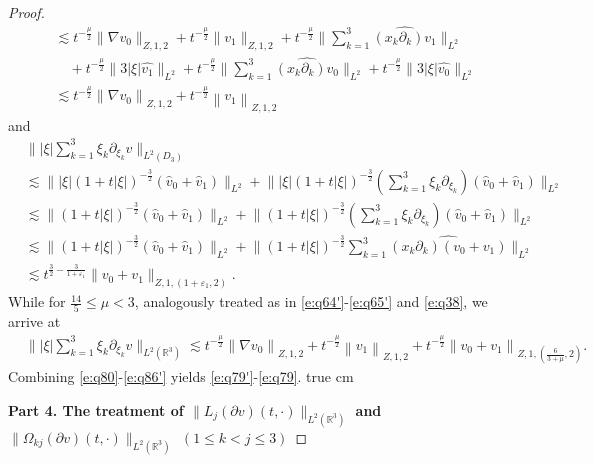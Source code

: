 \documentclass[11pt,twoside]{article}
\newcommand{\R}{\mathbb R}
\newcommand{\p}{\partial}
\newcommand{\f}{\frac}
\newcommand{\ds}{\displaystyle}
\theoremstyle{plain}
\theoremstyle{definition}
\theoremstyle{remark}
\numberwithin{equation}{section}
\begin{document}
\begin{proof}
\begin{equation}
\begin{aligned}
& \lesssim t^{-\frac{\mu}{2}}\big\|\nabla v_{0}\big\|_{Z, 1, 2}+ t^{-\frac{\mu}{2}}\big\|v_{1}\big\|_{Z, 1, 2}+ t^{-\f{\mu}{2}}
\big\|\ds\sum_{k=1}^3\widehat{(x_k\p_k)v_1}\big\|_{L^{2}}\\
&\quad+ t^{-\f{\mu}{2}} \big\|3|\xi|\widehat{v_1}\big\|_{L^{2}}+t^{-\f{\mu}{2}} \big\|\ds\sum_{k=1}^3\widehat{(x_k\p_k)v_0}\big\|_{L^{2}}+ t^{-\f{\mu}{2}} \big\|3|\xi|\widehat{v_0}\big\|_{L^{2}}\\
&\lesssim  t^{-\f{\mu}{2}}\left\|\nabla v_0\right\|_{Z, 1, 2}+t^{-\f{\mu}{2}}\left\|v_1\right\|_{Z, 1, 2}
\end{aligned}
\end{equation}
and
\begin{equation}\label{e:q86}
\begin{aligned}
&\||\xi|\ds\sum_{k=1}^3\xi_k\p_{\xi_k}\hat{v}\|_{L^2(D_3)}\\
&\lesssim \big\||\xi|(1+t|\xi|)^{-\f32}(\hat{v}_{0}+\hat{v}_{1})\big\|_{L^{2}}+ \big\||\xi|(1+t|\xi|)^{-\f32}(\ds\sum_{k=1}^3\xi_k\p_{\xi_k})(\hat{v}_{0}+\hat{v}_{1})\big\|_{L^{2}}\\
&\lesssim \big\|(1+t|\xi|)^{-\f32}(\hat{v}_{0}+\hat{v}_{1})\big\|_{L^{2}}+ \big\|(1+t|\xi|)^{-\f32}(\ds\sum_{k=1}^3\xi_k\p_{\xi_k})(\hat{v}_{0}+\hat{v}_{1})\big\|_{L^{2}}\\
& \lesssim \big\|(1+t|\xi|)^{-\f{3}{2}}(\hat{v}_{0}+\hat{v}_{1})\big\|_{L^{2}}+
\big\|(1+t|\xi|)^{-\f{3}{2}}\ds\sum_{k=1}^3\widehat{(x_k\p_k)(v_0+v_1)}\big\|_{L^{2}}\\
&\lesssim  t^{\f32-\f{3}{1+\varepsilon_1}}\big\|v_0+v_1\big\|_{Z, 1,(1+\varepsilon_1, 2)}.
\end{aligned}
\end{equation}
While for $\f{14}{5}\leq\mu<3$, analogously treated as in \eqref{e:q64'}-\eqref{e:q65'} and \eqref{e:q38}, we arrive at
\begin{equation}\label{e:q86'}
\begin{aligned}
&\||\xi|\ds\sum_{k=1}^3\xi_k\p_{\xi_k}\hat{v}\|_{L^2(\R^3)}
\lesssim t^{-\f{\mu}{2}}\left\|\nabla v_0\right\|_{Z, 1,  2}+t^{-\f{\mu}{2}}\left\| v_1\right\|_{Z, 1,  2}
+t^{-\f{\mu}{2}}\left\|v_0+v_1\right\|_{Z, 1,  (\f{6}{3+\mu},2)}.
\end{aligned}
\end{equation}
Combining \eqref{e:q80}-\eqref{e:q86'} yields \eqref{e:q79'}-\eqref{e:q79}.
 true cm

{\bf Part 4.  The treatment  of $\|L_j(\p v)(t, \cdot)\|_{L^2(\R^3)}$ and $\|\Omega_{kj}(\p v)(t, \cdot)\|_{L^2(\R^3)}$ $(1\le k<j\le3)$}


\end{proof}
\end{document}
